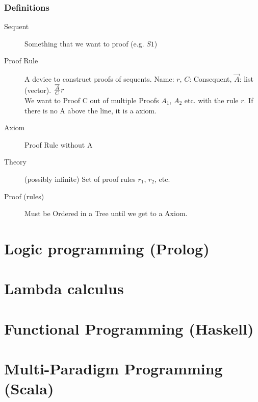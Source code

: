 \subsubsection{Definitions}

\begin{description}
	\item[Sequent] Something that we want to proof (e.g. $S1$)
	\item[Proof Rule] A device to construct proofs of sequents. Name: $r$, $C$: Consequent, $\overrightarrow{A}$: list (vector).
	$\frac{\overrightarrow{A}}{C} \boldmath{r}$ \\
	We want to Proof C out of multiple Proofs $A_1$, $A_2$ etc. with the rule $r$. If there is no A above the line, it is a axiom.
	\item[Axiom] Proof Rule without A %
	\item[Theory] (possibly infinite) Set of proof rules $r_1$, $r_2$, etc.
	\item[Proof (rules)] Must be Ordered in a Tree until we get to a Axiom. %
\end{description}

\section{Logic programming (Prolog)}

\section{Lambda calculus}

\section{Functional Programming (Haskell)}

\section{Multi-Paradigm Programming (Scala)}



